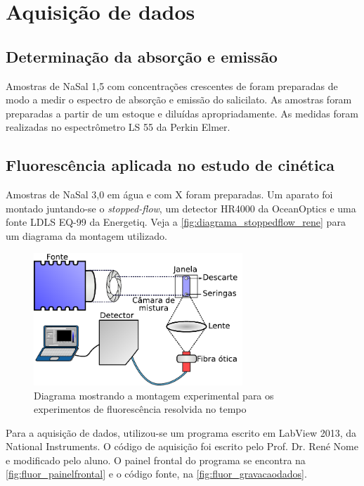 		\section{Aquisição de dados}
			\subsection{Determinação da absorção e emissão}
			
			Amostras de NaSal 1,5\mM{} com concentrações crescentes de \TTAB{} foram preparadas de modo a medir o espectro de absorção e emissão do salicilato. As amostras foram preparadas a partir de um estoque e diluídas apropriadamente. As medidas foram realizadas no espectrômetro LS 55 da Perkin Elmer.
			
			\subsection{Fluorescência aplicada no estudo de cinética}
			\label{sec:experimental_fluor_resolvida}

			Amostras de NaSal 3,0\mM{} em água e com \TTAB X\mM{} foram preparadas. Um aparato foi montado juntando-se o \emph{stopped-flow}, um detector HR4000 da OceanOptics e uma fonte LDLS EQ-99 da Energetiq. Veja a \autoref{fig:diagrama_stoppedflow_rene} para um diagrama da montagem utilizado.
			
			\begin{figure}[h]
				\centering
				\includegraphics[width=0.7\textwidth]{imagens/fluor/diagrama_stopped_flow_rene}
				\caption{Diagrama mostrando a montagem experimental para os experimentos de fluorescência resolvida no tempo}
				\label{fig:diagrama_stoppedflow_rene}
			\end{figure}
			
			Para a aquisição de dados, utilizou-se um programa escrito em LabView 2013, da National Instruments. O código de aquisição foi escrito pelo Prof. Dr. René Nome e modificado pelo aluno. O painel frontal do programa se encontra na \autoref{fig:fluor_painelfrontal} e o código fonte, na \autoref{fig:fluor_gravacaodados}.
			
